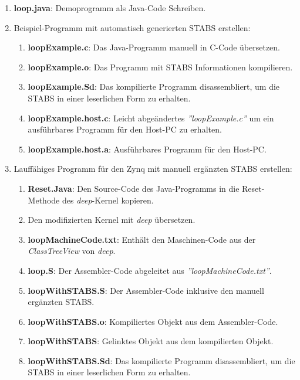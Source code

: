 \begin{enumerate}
	\item \textbf{loop.java}: Demoprogramm als Java-Code Schreiben.
	\item Beispiel-Programm mit automatisch generierten STABS erstellen:
	\begin{enumerate}
		\item \textbf{loopExample.c}: Das Java-Programm manuell in C-Code übersetzen.
		\item \textbf{loopExample.o}: Das Programm mit STABS Informationen kompilieren.
		\item \textbf{loopExample.Sd}: Das kompilierte Programm disassembliert, um die STABS in einer leserlichen Form zu erhalten.
		\item \textbf{loopExample.host.c}: Leicht abgeändertes \textit{''loopExample.c''} um ein ausführbares Programm für den Host-PC zu erhalten.
		\item \textbf{loopExample.host.a}: Ausführbares Programm für den Host-PC.
	\end{enumerate}
	\item Lauffähiges Programm für den Zynq mit manuell ergänzten STABS erstellen:
	\begin{enumerate}
		\item \textbf{Reset.Java}: Den Source-Code des Java-Programms in die Reset-Methode des \textit{deep}-Kernel kopieren.
		\item Den modifizierten Kernel mit \textit{deep} übersetzen.
		\item \textbf{loopMachineCode.txt}: Enthält den Maschinen-Code aus der \textit{ClassTreeView} von \textit{deep}.
		\item \textbf{loop.S}: Der Assembler-Code abgeleitet aus \textit{''loopMachineCode.txt''}.
		\item \textbf{loopWithSTABS.S}: Der Assembler-Code inklusive den manuell ergänzten STABS.
		\item \textbf{loopWithSTABS.o}: Kompiliertes Objekt aus dem Assembler-Code.
		\item \textbf{loopWithSTABS}: Gelinktes Objekt aus dem kompilierten Objekt.
		\item \textbf{loopWithSTABS.Sd}: Das kompilierte Programm disassembliert, um die STABS in einer leserlichen Form zu erhalten.
	\end{enumerate}
\end{enumerate}




